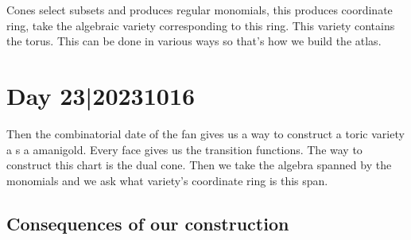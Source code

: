 \documentclass[12pt]{memoir}
\theoremstyle{definition}
\begin{document}
Cones select subsets and produces regular monomials, this produces coordinate ring, take the algebraic variety corresponding to this ring. This variety contains the torus. This can be done in various ways so that's how we build the atlas.

\section{Day 23|20231016}

Then the combinatorial date of the fan gives us a way to construct a toric variety a s a amanigold. Every face gives us the transition functions. The way to construct this chart is the dual cone. Then we take the algebra spanned by the monomials and we ask what variety's coordinate ring is this span. 

\subsection{Consequences of our construction}
\end{document}
